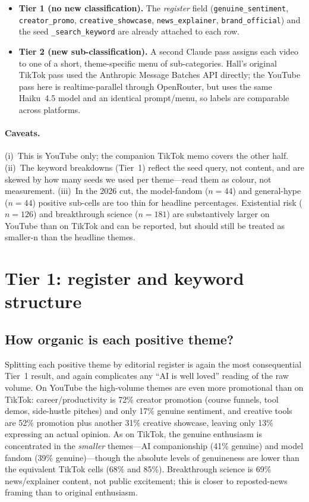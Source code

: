 \documentclass[11pt]{article}
\begin{document}
\begin{itemize}
  \item \textbf{Tier 1 (no new classification).} The \emph{register} field
  (\texttt{genuine\_sentiment}, \texttt{creator\_promo},
  \texttt{creative\_showcase}, \texttt{news\_explainer}, \texttt{brand\_official})
  and the seed \texttt{\_search\_keyword} are already attached to each row.
  \item \textbf{Tier 2 (new sub-classification).} A second Claude pass assigns
  each video to one of a short, theme-specific menu of sub-categories. Hall's
  original TikTok pass used the Anthropic Message Batches API directly; the
  YouTube pass here is realtime-parallel through OpenRouter, but uses the same
  Haiku~4.5 model and an identical prompt/menu, so labels are comparable across
  platforms.
\end{itemize}

\paragraph{Caveats.} (i)~This is YouTube only; the companion TikTok memo
covers the other half. (ii)~The keyword breakdowns (Tier~1) reflect the seed
query, not content, and are skewed by how many seeds we used per theme---read
them as colour, not measurement. (iii)~In the 2026 cut, the model-fandom
($n=44$) and general-hype ($n=44$) positive sub-cells are too thin for headline
percentages. Existential risk ($n=126$) and breakthrough science ($n=181$) are
substantively larger on YouTube than on TikTok and can be reported, but should
still be treated as smaller-n than the headline themes.

\clearpage
\section{Tier 1: register and keyword structure}

\subsection{How organic is each positive theme?}

Splitting each positive theme by editorial register is again the most
consequential Tier~1 result, and again complicates any ``AI is well loved''
reading of the raw volume. On YouTube the high-volume themes are even more
promotional than on TikTok: career/productivity is 72\% creator promotion (course
funnels, tool demos, side-hustle pitches) and only 17\% genuine sentiment, and
creative tools are 52\% promotion plus another 31\% creative showcase, leaving
only 13\% expressing an actual opinion. As on TikTok, the genuine enthusiasm is
concentrated in the \emph{smaller} themes---AI companionship (41\% genuine) and
model fandom (39\% genuine)---though the absolute levels of genuineness are
lower than the equivalent TikTok cells (68\% and 85\%). Breakthrough science is
69\% news/explainer content, not public excitement; this is closer to
reposted-news framing than to original enthusiasm.
\end{document}
